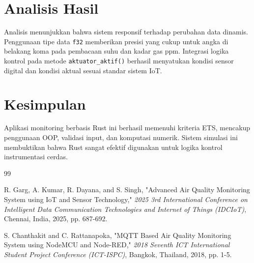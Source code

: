\documentclass[12pt, a4paper]{article}
\begin{document}
\section{Analisis Hasil}
Analisis menunjukkan bahwa sistem responsif terhadap perubahan data dinamis. Penggunaan tipe data \texttt{f32} memberikan presisi yang cukup untuk angka di belakang koma pada pembacaan suhu dan kadar gas ppm. Integrasi logika kontrol pada metode \texttt{aktuator\_aktif()} berhasil menyatukan kondisi sensor digital dan kondisi aktual sesuai standar sistem IoT.

\section{Kesimpulan}
Aplikasi monitoring berbasis Rust ini berhasil memenuhi kriteria ETS, mencakup penggunaan OOP, validasi input, dan komputasi numerik. Sistem simulasi ini membuktikan bahwa Rust sangat efektif digunakan untuk logika kontrol instrumentasi cerdas.
\begin{thebibliography}{99}

R. Garg, A. Kumar, R. Dayana, and S. Singh, "Advanced Air Quality Monitoring System using IoT and Sensor Technology," \textit{2025 3rd International Conference on Intelligent Data Communication Technologies and Internet of Things (IDCIoT)}, Chennai, India, 2025, pp. 687-692.

S. Chanthakit and C. Rattanapoka, "MQTT Based Air Quality Monitoring System using NodeMCU and Node-RED," \textit{2018 Seventh ICT International Student Project Conference (ICT-ISPC)}, Bangkok, Thailand, 2018, pp. 1-5.

\end{thebibliography}
\end{document}
